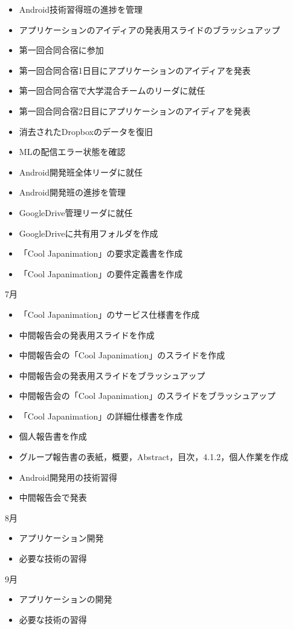 \begin{itemize}
\item Android技術習得班の進捗を管理
\item アプリケーションのアイディアの発表用スライドのブラッシュアップ
\item 第一回合同合宿に参加
\item 第一回合同合宿1日目にアプリケーションのアイディアを発表
\item 第一回合同合宿で大学混合チームのリーダに就任
\item 第一回合同合宿2日目にアプリケーションのアイディアを発表
\item 消去されたDropboxのデータを復旧
\item MLの配信エラー状態を確認
\item Android開発班全体リーダに就任
\item Android開発班の進捗を管理
\item GoogleDrive管理リーダに就任
\item GoogleDriveに共有用フォルダを作成
\item 「Cool Japanimation」の要求定義書を作成
\item 「Cool Japanimation」の要件定義書を作成
\end{itemize}
7月
\begin{itemize}
\item 「Cool Japanimation」のサービス仕様書を作成
\item 中間報告会の発表用スライドを作成
\item 中間報告会の「Cool Japanimation」のスライドを作成
\item 中間報告会の発表用スライドをブラッシュアップ
\item 中間報告会の「Cool Japanimation」のスライドをブラッシュアップ
\item 「Cool Japanimation」の詳細仕様書を作成
\item 個人報告書を作成
\item グループ報告書の表紙，概要，Abstract，目次，4.1.2，個人作業を作成
\item Android開発用の技術習得
\item 中間報告会で発表
\end{itemize}
8月
\begin{itemize}
\item アプリケーション開発
\item 必要な技術の習得
\end{itemize}
9月
\begin{itemize}
\item アプリケーションの開発
\item 必要な技術の習得
\end{itemize}
